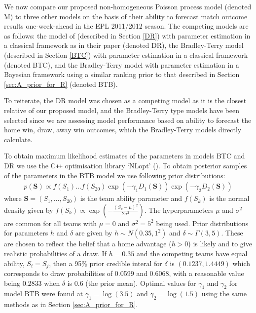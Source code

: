 We now compare our proposed non-homogeneous Poisson process model (denoted M) to three other models on the basis of their
ability to forecast match outcome results one-week-ahead in the \gls{EPL} 2011/2012 season. The competing models are as
follows: the model of \cite{DixonRobinson1998} (described in Section \ref{DR}) with parameter estimation in a classical
framework as in their paper (denoted DR), the Bradley-Terry model (described in Section \ref{BTC}) with parameter
estimation in a classical framework (denoted BTC), and the Bradley-Terry model with parameter estimation in a Bayesian
framework using a similar ranking prior to that described in Section \ref{sec:A_prior_for_R} (denoted BTB).

To reiterate, the DR model was chosen as a competing model as it is the closest relative of our proposed model, and the
Bradley-Terry type models have been selected since we are assessing model performance based on ability to forecast the
home win, draw, away win outcomes, which the Bradley-Terry models directly calculate.

To obtain maximum likelihood estimates of the parameters in models BTC and DR we use the C\texttt{++} optimisation library
`NLopt' (\cite{nlopt2010}). To obtain posterior samples of the parameters in the BTB model we use following prior
distributions:
\begin{align}
p(\boldsymbol{S}) \propto f(S_1) \ldots f(S_{20}) \exp(-\gamma_1 D_1(\boldsymbol{S})) \exp(-\gamma_2
D_2(\boldsymbol{S}))
\end{align}
where \(\boldsymbol{S} = (S_1, \ldots, S_{20})\) is the team ability parameter and \(f(S_k)\) is the normal density
given by \(f(S_k) \propto \exp(-\frac{(S_k - \mu)^2}{2 \sigma^2})\). The hyperparameters \(\mu\) and \(\sigma^2\) are
common for all teams with \(\mu = 0\) and \(\sigma^2 = 5^2\) being used. Prior distributions for parameters \(h\) and
\(\delta\) are given by \(h \sim N(0.35, 1^2)\) and \(\delta \sim \Gamma(3, 5)\).
These are chosen to reflect the belief that a home advantage (\(h > 0\)) is likely and to give realistic probabilities
of a draw. If \(h = 0.35\) and the competing teams have equal ability, \(S_i = S_j\), then a 95\% prior credible interal
for \(\delta\) is \((0.1237, 1.4449)\) which corresponds to draw probabilities of 0.0599 and 0.6068, with a reasonable
value being 0.2833 when \(\delta\) is 0.6 (the prior mean). Optimal values for \(\gamma_1\) and \(\gamma_2\) for model
BTB were found at \(\gamma_1 = \log(3.5)\) and \(\gamma_2 = \log(1.5)\) using the same methods as in Section
\ref{sec:A_prior_for_R}.

